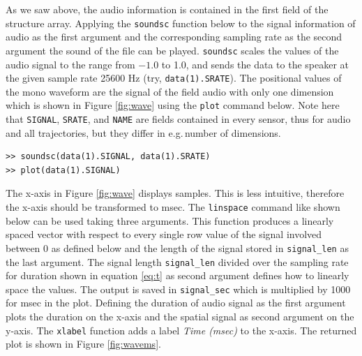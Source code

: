\documentclass[a4paper, 12pt]{article}
\begin{document}
As we saw above, the audio information is contained in the first field of the structure array. Applying the \texttt{soundsc} function below to the signal information of audio as the first argument and the corresponding sampling rate as the second argument the sound of the file can be played. \texttt{soundsc} scales the values of the audio signal to the range from $-1.0$ to 1.0, and sends the data to the speaker at the given sample rate 25600 Hz (try, \texttt{data(1).SRATE}). The positional values of the mono waveform are the signal of the field audio with only one dimension which is shown in Figure \ref{fig:wave} using the \texttt{plot} command below. Note here that \texttt{SIGNAL}, \texttt{SRATE}, and \texttt{NAME} are fields contained in every sensor, thus for audio and all trajectories, but they differ in e.g.\,number of dimensions.
  
\begin{verbatim}
>> soundsc(data(1).SIGNAL, data(1).SRATE)
>> plot(data(1).SIGNAL)
\end{verbatim}

The x-axis in Figure \ref{fig:wave} displays samples. This is less intuitive, therefore the x-axis should be transformed to msec. The \texttt{linspace} command like shown below can be used taking three arguments. This function produces a linearly spaced vector with respect to every single row value of the signal involved between 0 as defined below and the length of the signal stored in \texttt{signal\_len} as the last argument. The signal length \texttt{signal\_len} divided over the sampling rate for duration shown in equation \eqref{eq:t} as second argument defines how to linearly space the values. The output is saved in \texttt{signal\_sec} which is multiplied by 1000 for msec in the plot. Defining the duration of audio signal as the first argument plots the duration on the x-axis and the spatial signal as second argument on the y-axis. The \texttt{xlabel} function adds a label \textit{Time (msec)} to the x-axis. The returned plot is shown in Figure \ref{fig:wavems}.
\end{document}
